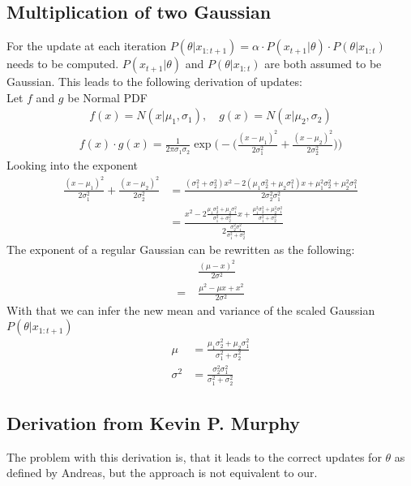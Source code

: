 \documentclass{article}
\begin{document}
\subsection{Multiplication of two Gaussian}
For the update at each iteration $ P(\theta | x_{1:t+1}) = \alpha \cdot P(x_{t+1} | \theta) \cdot P( \theta | x_{1:t}) $ needs to be computed. $P(x_{t+1} | \theta)$ and $P( \theta | x_{1:t})$ are both assumed to be Gaussian. This leads to the following 
derivation of updates:\\
Let $f$ and $g$ be Normal PDF
\begin{align}
    f(x) = N(x | \mu_1, \sigma_1), \quad g(x) = N(x | \mu_2, \sigma_2) 
\end{align}
\begin{align}
    f(x)\cdot g(x) = \frac{1}{2\pi \sigma_1 \sigma_2}\exp\left. \Bigg(-\left. \Bigg(\frac{(x-\mu_1)^2}{2\sigma_1^2} + \frac{(x-\mu_2)^2}{2\sigma_2^2}\right. \Bigg)\right. \Bigg)
\end{align}
Looking into the exponent
\begin{align}
    \frac{(x-\mu_1)^2}{2\sigma_1^2} + \frac{(x-\mu_2)^2}{2\sigma_2^2}
    &= \frac{(\sigma_1^2+\sigma_2^2)x^2 - 2(\mu_1\sigma_2^2+\mu_2\sigma_1^2)x + \mu_1^2\sigma_2^2 + \mu_2^2\sigma_1^2}{2\sigma_2^2\sigma_1^2}
    \\
    &= \frac{x^2 - 2\frac{\mu_1\sigma_2^2+\mu_2\sigma_1^2}{\sigma_1^2+\sigma_2^2}x + \frac{\mu_1^2\sigma_2^2 + \mu_2^2\sigma_1^2}{\sigma_1^2+\sigma_2^2}}{2\frac{\sigma_2^2\sigma_1^2}{\sigma_1^2+\sigma_2^2}}\label{twoGaussEx}
\end{align}
The exponent of a regular Gaussian can be rewritten as the following:
\begin{align}
   & \frac{(\mu - x)^2}{2\sigma^2}\\
    =\; &\frac{\mu^2 - \mu x + x^2}{2\sigma^2}
\end{align}
With that we can infer the new mean and variance of the scaled Gaussian $ P(\theta | x_{1:t+1})$ 
\begin{align}
    \mu &= \frac{\mu_1\sigma_2^2+\mu_2\sigma_1^2}{\sigma_1^2+\sigma_2^2}
    \\
    \sigma^2 &= \frac{\sigma_2^2\sigma_1^2}{\sigma_1^2+\sigma_2^2}
\end{align}

\subsection{Derivation from Kevin P. Murphy}
The problem with this derivation is, that it leads to the correct updates for $\theta$ as defined by Andreas, but the approach is not equivalent to our. 
\end{document}
